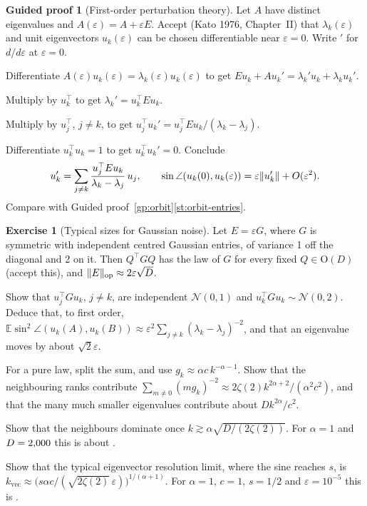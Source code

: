 \documentclass[11pt,a4paper]{article}
\newcommand{\E}{\mathbb{E}}
\newcommand{\Orth}{\mathrm{O}}
\DeclarePairedDelimiter{\norm}{\lVert}{\rVert}
\newcommand{\op}{\mathrm{op}}
\theoremstyle{plain}
\theoremstyle{definition}
\newtheorem{exercise}[proposition]{Exercise}
\newtheorem{guided}[proposition]{Guided proof}
\theoremstyle{remark}
\begin{document}
\begin{guided}[First-order perturbation theory]\label{gp:firstorder}
Let $A$ have distinct eigenvalues and $A(\varepsilon)=A+\varepsilon E$. Accept (Kato 1976, Chapter~II) that
$\lambda_k(\varepsilon)$ and unit eigenvectors $u_k(\varepsilon)$ can be chosen differentiable near $\varepsilon=0$.
Write $'$ for $d/d\varepsilon$ at $\varepsilon=0$.
\begin{steps}
\item Differentiate $A(\varepsilon)u_k(\varepsilon)=\lambda_k(\varepsilon)u_k(\varepsilon)$ to get
  $Eu_k+Au_k'=\lambda_k'u_k+\lambda_ku_k'$.
\item Multiply by $u_k^\top$ to get $\lambda_k'=u_k^\top Eu_k$.
\item Multiply by $u_j^\top$, $j\ne k$, to get $u_j^\top u_k'=u_j^\top Eu_k/(\lambda_k-\lambda_j)$.
\item Differentiate $u_k^\top u_k=1$ to get $u_k^\top u_k'=0$. Conclude
  \[u_k'=\sum_{j\ne k}\frac{u_j^\top Eu_k}{\lambda_k-\lambda_j}\,u_j,\qquad
  \sin\angle(u_k(0),u_k(\varepsilon))=\varepsilon\norm{u_k'}+O(\varepsilon^2).\]
  Compare with Guided proof~\ref{gp:orbit}\ref{st:orbit-entries}.
\end{steps}
\end{guided}

\begin{exercise}[Typical sizes for Gaussian noise]\label{ex:typical}
Let $E=\varepsilon G$, where $G$ is symmetric with independent centred Gaussian entries, of variance 1 off the
diagonal and 2 on it. Then $Q^\top GQ$ has the law of $G$ for every fixed $Q\in\Orth(D)$ (accept this), and
$\norm{E}_\op\approx2\varepsilon\sqrt D$.
\begin{steps}
\item Show that $u_j^\top Gu_k$, $j\ne k$, are independent $\mathcal{N}(0,1)$ and $u_k^\top Gu_k\sim\mathcal{N}(0,2)$.
  Deduce that, to first order, $\E\sin^2\angle(u_k(A),u_k(B))\approx\varepsilon^2\sum_{j\ne k}(\lambda_k-\lambda_j)^{-2}$,
  and that an eigenvalue moves by about $\sqrt2\varepsilon$.
\item For a pure law, split the sum, and use $g_k\approx\alpha c\,k^{-\alpha-1}$. Show that the neighbouring ranks
  contribute $\sum_{m\ne0}(mg_k)^{-2}\approx2\zeta(2)k^{2\alpha+2}/(\alpha^2c^2)$, and that the many much smaller
  eigenvalues contribute about $Dk^{2\alpha}/c^2$.
\item Show that the neighbours dominate once $k\gtrsim\alpha\sqrt{D/(2\zeta(2))}$. For $\alpha=1$ and
  $D=2{,}000$ this is about \NumNeighbourRank.
\item Show that the typical eigenvector resolution limit, where the sine reaches $s$, is
  $k_{\text{vec}}\approx\bigl(s\alpha c/(\sqrt{2\zeta(2)}\,\varepsilon)\bigr)^{1/(\alpha+1)}$. For $\alpha=1$, $c=1$,
  $s=1/2$ and $\varepsilon=10^{-5}$ this is \NumKvecPred.
\end{steps}
\end{exercise}
\end{document}
